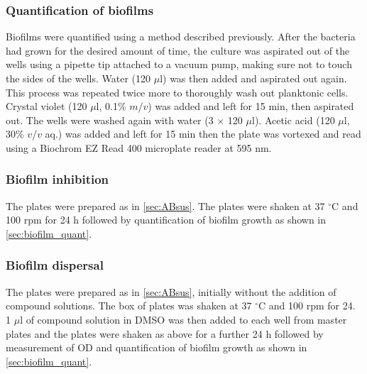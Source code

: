 \subsubsection{Quantification of biofilms\label{sec:biofilm_quant}}

Biofilms were quantified using a method described previously\cite{OToole1998,Li2015a}.
After the bacteria had grown for the desired amount of time, the culture was aspirated out of the wells using a pipette tip attached to a vacuum pump, making sure not to touch the sides of the wells. Water (120 $\mu$l) was then added and aspirated out again. This process was repeated twice more to thoroughly wash out planktonic cells. Crystal violet (120 $\mu$l, 0.1\% $m$/$v$) was added and left for 15 min, then aspirated out. The wells were washed again with water (3 $\times$ 120 $\mu$l). Acetic acid (120 $\mu$l, 30\% $v$/$v$ aq.) was added and left for 15 min then the plate was vortexed and read using a Biochrom EZ Read 400 microplate reader at 595 nm.

\subsubsection{Biofilm inhibition}

The plates were prepared as in \ref{sec:ABsus}. The plates were shaken at 37 $^{\circ}$C and 100 rpm for 24 h followed by quantification of biofilm growth as shown in \ref{sec:biofilm_quant}.

\subsubsection{Biofilm dispersal \label{sec:disp}}

The plates were prepared as in \ref{sec:ABsus}, initially without the addition of compound solutions. The box of plates was shaken at 37 $^{\circ}$C and 100 rpm for 24.
1 $\mu$l of compound solution in DMSO was then added to each well from master plates and the plates were shaken as above for a further 24 h followed by measurement of OD and quantification of biofilm growth as shown in \ref{sec:biofilm_quant}.

